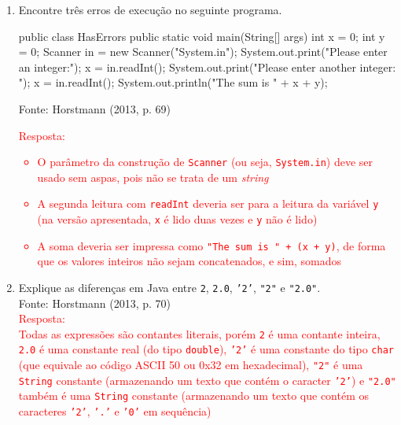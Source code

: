 \documentclass[onecolumn,a4paper,10pt]{report}
\newcommand{\+}{\, + \,}
\newcommand{\<}{\hspace*{-0.4cm}}
\begin{document}
\begin{enumerate}[1.]
\item Encontre três erros de execução no seguinte programa.\\
\begin{javacode}
public class HasErrors
{
   public static void main(String[] args)
   {
      int x = 0;
      int y = 0;
      Scanner in = new Scanner("System.in");
      System.out.print("Please enter an integer:");
      x = in.readInt();
      System.out.print("Please enter another integer: ");
      x = in.readInt();
      System.out.println("The sum is " + x + y);
   }
}
\end{javacode}
{\tiny Fonte: Horstmann (2013, p. 69)}\\
\textcolor{red}{Resposta:
\begin{itemize}
\item O parâmetro da construção de \texttt{Scanner} (ou seja, \texttt{System.in}) deve ser usado sem aspas, pois não se trata de um \emph{string}
\item A segunda leitura com \texttt{readInt} deveria ser para a leitura da variável \texttt{y} (na versão apresentada, \texttt{x} é lido duas vezes e \texttt{y} não é lido)
\item A soma deveria ser impressa como \texttt{"The sum is " + (x + y)}, de forma que os valores inteiros não sejam concatenados, e sim, somados
\end{itemize}
}

\item Explique as diferenças em Java entre \texttt{2}, \texttt{2.0}, \texttt{'2'}, \texttt{"2"} e \texttt{"2.0"}.\\
{\tiny Fonte: Horstmann (2013, p. 70)}\\
\textcolor{red}{Resposta:\\
Todas as expressões são contantes literais, porém \texttt{2} é uma contante inteira, \texttt{2.0} é uma constante real (do tipo \texttt{double}), \texttt{'2'} é uma constante do tipo \texttt{char} (que equivale ao código ASCII 50 ou 0x32 em hexadecimal), \texttt{"2"} é uma \texttt{String} constante (armazenando um texto que contém o caracter \texttt{'2'}) e \texttt{"2.0"} também é uma \texttt{String} constante (armazenando um texto que contém os caracteres \texttt{'2'}, \texttt{'.'} e \texttt{'0'} em sequência)
}


\end{enumerate}
\end{document}

